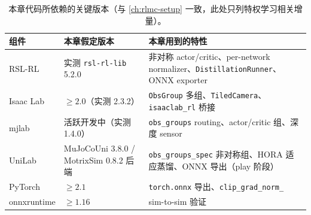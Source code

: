 \begin{table}[H]
\centering
\small
\caption{本章代码所依赖的关键版本（与 \cref{ch:rlmc-setup} 一致，此处只列特权学习相关增量）。}
\label{tab:rlmc-priv-versions}
\begin{tabular}{@{}lll@{}}
\toprule
组件 & 本章假定版本 & 本章用到的特性 \\
\midrule
RSL-RL & 实测 \texttt{rsl-rl-lib} 5.2.0 & 非对称 actor/critic、per-network normalizer、\texttt{DistillationRunner}、ONNX exporter \\
Isaac Lab & $\ge 2.0$（实测 2.3.2） & \texttt{ObsGroup} 多组、\texttt{TiledCamera}、\texttt{isaaclab\_rl} 桥接 \\
mjlab & 活跃开发中（实测 1.4.0） & \texttt{obs\_groups} routing、actor/critic 组、深度 sensor \\
UniLab & MuJoCoUni 3.8.0 / MotrixSim 0.8.2 后端 & \texttt{obs\_groups\_spec} 非对称组、HORA 适应蒸馏、ONNX 导出（play 阶段） \\
PyTorch & $\ge 2.1$ & \texttt{torch.onnx} 导出、\texttt{clip\_grad\_norm\_} \\
onnxruntime & $\ge 1.16$ & sim-to-sim 验证 \\
\bottomrule
\end{tabular}
\end{table}


